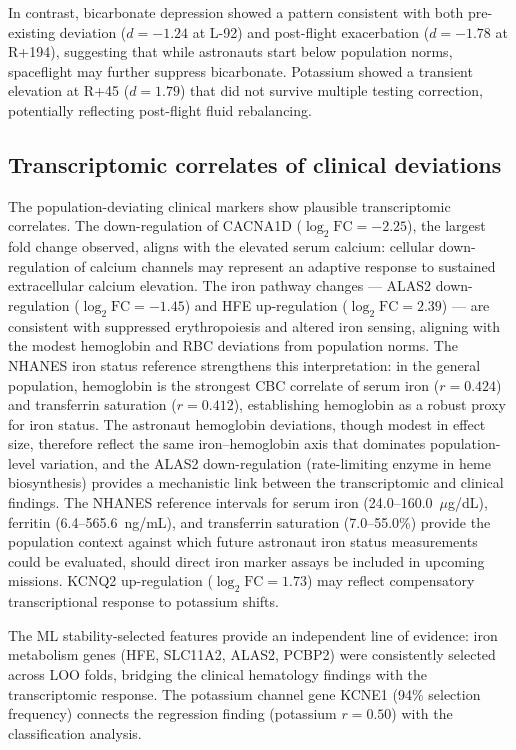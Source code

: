\documentclass[11pt,a4paper]{article}
\begin{document}
In contrast, bicarbonate depression showed a pattern consistent with both pre-existing deviation ($d = -1.24$ at L-92) and post-flight exacerbation ($d = -1.78$ at R+194), suggesting that while astronauts start below population norms, spaceflight may further suppress bicarbonate. Potassium showed a transient elevation at R+45 ($d = 1.79$) that did not survive multiple testing correction, potentially reflecting post-flight fluid rebalancing.

\subsection{Transcriptomic correlates of clinical deviations}

The population-deviating clinical markers show plausible transcriptomic correlates. The down-regulation of CACNA1D ($\log_2\text{FC} = -2.25$), the largest fold change observed, aligns with the elevated serum calcium: cellular down-regulation of calcium channels may represent an adaptive response to sustained extracellular calcium elevation. The iron pathway changes --- ALAS2 down-regulation ($\log_2\text{FC} = -1.45$) and HFE up-regulation ($\log_2\text{FC} = 2.39$) --- are consistent with suppressed erythropoiesis and altered iron sensing, aligning with the modest hemoglobin and RBC deviations from population norms. The NHANES iron status reference strengthens this interpretation: in the general population, hemoglobin is the strongest CBC correlate of serum iron ($r = 0.424$) and transferrin saturation ($r = 0.412$), establishing hemoglobin as a robust proxy for iron status. The astronaut hemoglobin deviations, though modest in effect size, therefore reflect the same iron--hemoglobin axis that dominates population-level variation, and the ALAS2 down-regulation (rate-limiting enzyme in heme biosynthesis) provides a mechanistic link between the transcriptomic and clinical findings. The NHANES reference intervals for serum iron (24.0--160.0~$\mu$g/dL), ferritin (6.4--565.6~ng/mL), and transferrin saturation (7.0--55.0\%) provide the population context against which future astronaut iron status measurements could be evaluated, should direct iron marker assays be included in upcoming missions. KCNQ2 up-regulation ($\log_2\text{FC} = 1.73$) may reflect compensatory transcriptional response to potassium shifts.

The ML stability-selected features provide an independent line of evidence: iron metabolism genes (HFE, SLC11A2, ALAS2, PCBP2) were consistently selected across LOO folds, bridging the clinical hematology findings with the transcriptomic response. The potassium channel gene KCNE1 (94\% selection frequency) connects the regression finding (potassium $r = 0.50$) with the classification analysis.
\end{document}
